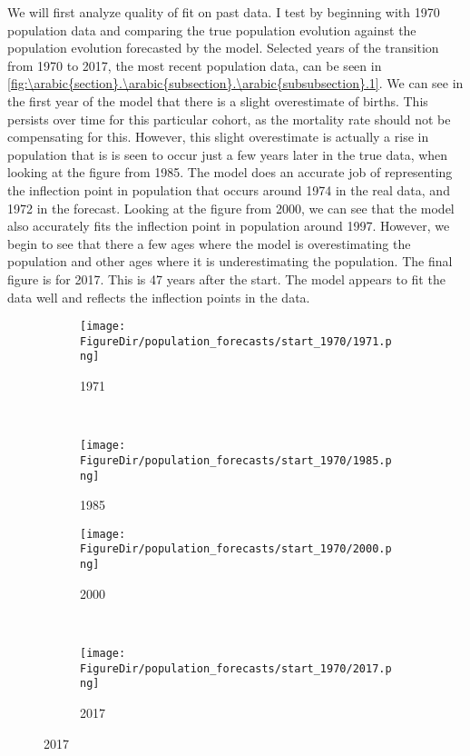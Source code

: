 \documentclass[10pt]{article}
\renewcommand{\thesection}{\arabic{section}}
\renewcommand{\thesubsection}{\thesection.\arabic{subsection}}
\renewcommand{\thesubsubsection}{\thesubsection.\arabic{subsubsection}}
\numberwithin{equation}{subsection}
\newcommand*{\FigureDir}{../../graphs}
\begin{document}
\par We will first analyze quality of fit on past data. I test by beginning with 1970 population data and comparing the true population evolution against the population evolution forecasted by the model. Selected years of the transition from 1970 to 2017, the most recent population data, can be seen in \autoref{fig:\thesubsubsection.1}. We can see in the first year of the model that there is a slight overestimate of births. This persists over time for this particular cohort, as the mortality rate should not be compensating for this. However, this slight overestimate is actually a rise in population that is is seen to occur just a few years later in the true data, when looking at the figure from 1985. The model does an accurate job of representing the inflection point in population that occurs around 1974 in the real data, and 1972 in the forecast. Looking at the figure from 2000, we can see that the model also accurately fits the inflection point in population around 1997. However, we begin to see that there a few ages where the model is overestimating the population and other ages where it is underestimating the population. The final figure is for 2017. This is 47 years after the start. The model appears to fit the data well and reflects the inflection points in the data. 

\begin{figure}[!ht]
   \centering
   \caption{\label{fig:\thesubsubsection.1}Forecasted Versus True Population Initial Population Set to 1970}
   \begin{subfigure}{0.5\textwidth}
      \centering
      \texttt{[image: \\FigureDir/population\_forecasts/start\_1970/1971.png]}
      \caption{1971}
   \end{subfigure}%
   ~ %
   \begin{subfigure}{0.5\textwidth}
      \centering
      \texttt{[image: \\FigureDir/population\_forecasts/start\_1970/1985.png]}
      \caption{1985}
   \end{subfigure}%
   \newline
   \begin{subfigure}{0.5\textwidth}
      \centering
      \texttt{[image: \\FigureDir/population\_forecasts/start\_1970/2000.png]}
      \caption{2000}
   \end{subfigure}%
   ~ %
   \begin{subfigure}{0.5\textwidth}
      \centering
      \texttt{[image: \\FigureDir/population\_forecasts/start\_1970/2017.png]}
      \caption{2017}
   \end{subfigure}%
\end{figure}
\end{document}
